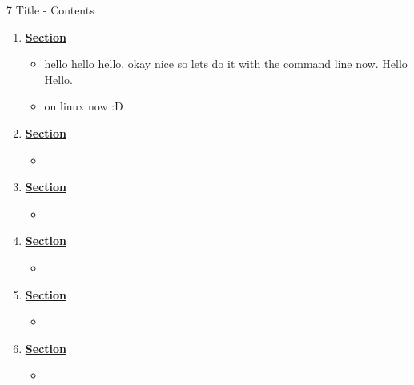 \documentclass[12pt,letterpaper]{article}
\begin{document}
\setcounter{section}{7} %
\begin{chapbox}{7 Title - Contents}{ 
\begin{enumerate}[font=\bfseries, wide]
\item \hyperlink{7.1}{\textbf{Section}}
    \begin{itemize}
        \item hello hello hello, okay nice so lets do it with the command line now. Hello Hello.
        \item on linux now :D
    \end{itemize}
    \item \hyperlink{7.2}{\textbf{Section}}
    \begin{itemize}
        \item 
    \end{itemize}
\item \hyperlink{7.3}{\textbf{Section}}
    \begin{itemize}
        \item 
    \end{itemize}
\item \hyperlink{7.4}{\textbf{Section}}
    \begin{itemize}
        \item 
    \end{itemize}
\item \hyperlink{7.5}{\textbf{Section}}
    \begin{itemize}
        \item 
    \end{itemize}
\item \hyperlink{7.6}{\textbf{Section}}
    \begin{itemize}
        \item 
    \end{itemize}
\end{enumerate}
}\end{chapbox}
\end{document}
